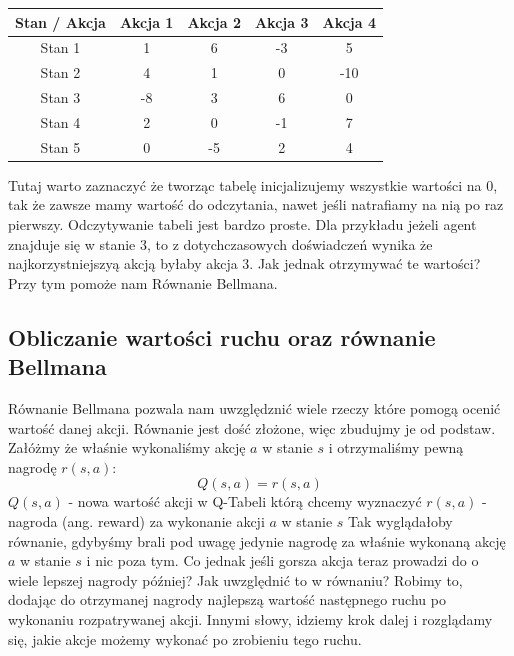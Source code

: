 \documentclass[a4paper,12pt]{article}
\begin{document}
\begin{center}
\begin{tabular}{ |c|c|c|c|c| }
\hline
Stan /  Akcja & Akcja 1 & Akcja 2 & Akcja 3 & Akcja 4 \\
\hline
Stan 1 & \small{1} & \small{6} & \small{-3} & \small{5} \\
\hline
Stan 2 & \small{4} & \small{1} & \small{0} & \small{-10} \\
\hline
Stan 3 & \small{-8} & \small{3} & \small{6} & \small{0} \\
\hline
Stan 4 & \small{2} & \small{0} & \small{-1} & \small{7} \\
\hline
Stan 5 & \small{0} & \small{-5} & \small{2} & \small{4} \\
\hline
\end{tabular}
\end{center}
Tutaj warto zaznaczyć że tworząc tabelę inicjalizujemy wszystkie wartości na 0, tak że zawsze mamy wartość do odczytania, nawet jeśli natrafiamy na nią po raz pierwszy. Odczytywanie tabeli jest bardzo proste. Dla przykładu jeżeli agent znajduje się w stanie 3, to z dotychczasowych doświadczeń wynika że najkorzystniejszyą akcją byłaby akcja 3. Jak jednak otrzymywać te wartości? Przy tym pomoże nam Równanie Bellmana.

\subsection{Obliczanie wartości ruchu oraz równanie Bellmana}

Równanie Bellmana pozwala nam uwzględznić wiele rzeczy które pomogą ocenić wartość danej akcji. Równanie jest dość złożone, więc zbudujmy je od podstaw. Załóżmy że właśnie wykonaliśmy akcję \(a\) w stanie \(s\) i otrzymaliśmy pewną nagrodę \(r(s, a)\):
\[ Q(s, a) =  r(s, a)\]
\(Q(s, a)\) - nowa wartość akcji w Q-Tabeli którą chcemy wyznaczyć \newline
\(r(s, a)\) - nagroda (ang. reward) za wykonanie akcji \(a\) w stanie \(s\) \newline
\newline Tak wyglądałoby równanie, gdybyśmy brali pod uwagę jedynie nagrodę za właśnie wykonaną akcję \(a\) w stanie \(s\) i nic poza tym.  \newline \newline Co jednak jeśli gorsza akcja teraz prowadzi do o wiele lepszej nagrody później? Jak uwzględnić to w równaniu? Robimy to, dodając do otrzymanej nagrody najlepszą wartość następnego ruchu po wykonaniu rozpatrywanej akcji. Innymi słowy, idziemy krok dalej i rozglądamy się, jakie akcje możemy wykonać po zrobieniu tego ruchu.
\end{document}
